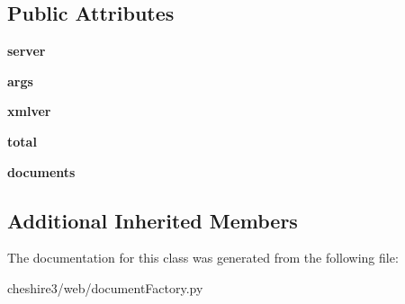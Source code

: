 \subsection*{Public Attributes}
\begin{DoxyCompactItemize}
\item 
\hypertarget{classcheshire3_1_1web_1_1document_factory_1_1_sru_document_stream_a2d9cd954bcf9aa16089983b2041bb394}{{\bfseries server}}\label{classcheshire3_1_1web_1_1document_factory_1_1_sru_document_stream_a2d9cd954bcf9aa16089983b2041bb394}

\item 
\hypertarget{classcheshire3_1_1web_1_1document_factory_1_1_sru_document_stream_a678649224f09909116647fde46318c2a}{{\bfseries args}}\label{classcheshire3_1_1web_1_1document_factory_1_1_sru_document_stream_a678649224f09909116647fde46318c2a}

\item 
\hypertarget{classcheshire3_1_1web_1_1document_factory_1_1_sru_document_stream_acc292c66537cda2878651de8ba8e8a66}{{\bfseries xmlver}}\label{classcheshire3_1_1web_1_1document_factory_1_1_sru_document_stream_acc292c66537cda2878651de8ba8e8a66}

\item 
\hypertarget{classcheshire3_1_1web_1_1document_factory_1_1_sru_document_stream_af3d30a5ade2ac4dada6e40f8f167c3fc}{{\bfseries total}}\label{classcheshire3_1_1web_1_1document_factory_1_1_sru_document_stream_af3d30a5ade2ac4dada6e40f8f167c3fc}

\item 
\hypertarget{classcheshire3_1_1web_1_1document_factory_1_1_sru_document_stream_a1936a844a5b4a6fd51bf1d0f41ac09fe}{{\bfseries documents}}\label{classcheshire3_1_1web_1_1document_factory_1_1_sru_document_stream_a1936a844a5b4a6fd51bf1d0f41ac09fe}

\end{DoxyCompactItemize}
\subsection*{Additional Inherited Members}


The documentation for this class was generated from the following file\-:\begin{DoxyCompactItemize}
\item 
cheshire3/web/document\-Factory.\-py\end{DoxyCompactItemize}
